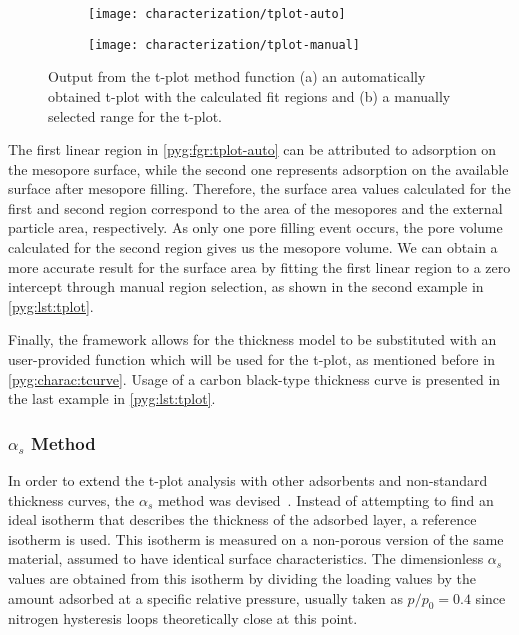 \begin{figure}[!htb]
	\centering

	\begin{subfigure}{0.45\linewidth}
		\parbox[c]{0.1\linewidth}{\caption{}%
			\label{pyg:fgr:tplot-auto}}
		\parbox[b]{0.85\linewidth}{%
			\texttt{[image: characterization/tplot-auto]}}
	\end{subfigure}%
	\begin{subfigure}{0.45\linewidth}
		\parbox[c]{0.1\linewidth}{\caption{}%
			\label{pyg:fgr:tplot-manual}}
		\parbox[b]{0.85\linewidth}{%
			\texttt{[image: characterization/tplot-manual]}}
	\end{subfigure}%

	\caption{Output from the t-plot method function (a) an automatically
		obtained t-plot with the calculated fit regions and (b) a manually
		selected range for the t-plot.}%
	\label{pyg:fgr:tplot}

\end{figure}

The first linear region in \autoref{pyg:fgr:tplot-auto} can be attributed
to adsorption on the mesopore surface,
while the second one represents adsorption on the available surface
after mesopore filling. Therefore, the surface area values calculated 
for the first and second region correspond to the area of the mesopores
and the external particle area, respectively. As only one pore filling 
event occurs, the pore volume calculated for the second region gives
us the mesopore volume. We can obtain a more accurate result for the
surface area by fitting the first linear region to a zero intercept
through manual region selection, as shown in the second example in 
\autoref{pyg:lst:tplot}.

Finally, the framework allows for the thickness model to be substituted
with an user-provided function which will be used for the t-plot, 
as mentioned before in \autoref{pyg:charac:tcurve}.
Usage of a carbon black-type thickness curve is presented in the last
example in \autoref{pyg:lst:tplot}.

\subsubsection{\(\alpha_s\) Method}\label{pyg:charac:alphasplot}

In order to extend the t-plot analysis with other adsorbents and 
non-standard thickness curves, the \(\alpha_s\) method was
devised~\cite{atkinsonAdsorptivePropertiesMicroporous1984}.
Instead of attempting to find an ideal isotherm that describes the
thickness of the adsorbed layer, a reference isotherm is used.
This isotherm is measured on a non-porous version of the same material,
assumed to have identical surface characteristics.
The dimensionless \(\alpha_s\) values are obtained from this isotherm by
dividing the loading values by the amount adsorbed at a specific relative
pressure, usually taken as \(p/p_0=0.4\) since nitrogen hysteresis loops
theoretically close at this point.

